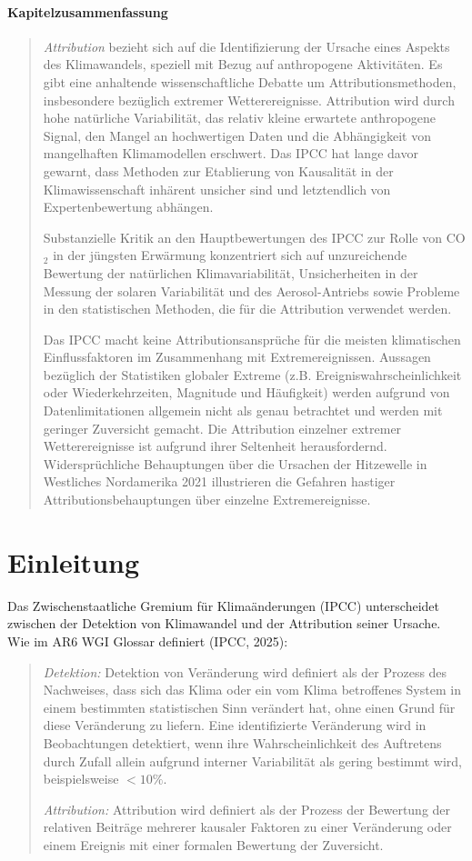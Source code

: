 \documentclass[12pt,paper=a4,DIV=12,parskip=never,chapterprefix=false,headings=standardclasses]{scrreprt}
\begin{document}
\paragraph{Kapitelzusammenfassung}
\begin{quote}
\emph{Attribution} bezieht sich auf die Identifizierung der Ursache eines Aspekts des Klimawandels, speziell mit Bezug auf anthropogene Aktivitäten. Es gibt eine anhaltende wissenschaftliche Debatte um Attributionsmethoden, insbesondere bezüglich extremer Wetterereignisse. Attribution wird durch hohe natürliche Variabilität, das relativ kleine erwartete anthropogene Signal, den Mangel an hochwertigen Daten und die Abhängigkeit von mangelhaften Klimamodellen erschwert. Das IPCC hat lange davor gewarnt, dass Methoden zur Etablierung von Kausalität in der Klimawissenschaft inhärent unsicher sind und letztendlich von Expertenbewertung abhängen.

Substanzielle Kritik an den Hauptbewertungen des IPCC zur Rolle von CO$_2$ in der jüngsten Erwärmung konzentriert sich auf unzureichende Bewertung der natürlichen Klimavariabilität, Unsicherheiten in der Messung der solaren Variabilität und des Aerosol-Antriebs sowie Probleme in den statistischen Methoden, die für die Attribution verwendet werden.

Das IPCC macht keine Attributionsansprüche für die meisten klimatischen Einflussfaktoren im Zusammenhang mit Extremereignissen. Aussagen bezüglich der Statistiken globaler Extreme (z.B. Ereigniswahrscheinlichkeit oder Wiederkehrzeiten, Magnitude und Häufigkeit) werden aufgrund von Datenlimitationen allgemein nicht als genau betrachtet und werden mit geringer Zuversicht gemacht. Die Attribution einzelner extremer Wetterereignisse ist aufgrund ihrer Seltenheit herausfordernd.
Widersprüchliche Behauptungen über die Ursachen der Hitzewelle in Westliches Nordamerika 2021 illustrieren die Gefahren hastiger Attributionsbehauptungen über einzelne Extremereignisse.
\end{quote}

\section{Einleitung}
Das Zwischenstaatliche Gremium für Klimaänderungen (IPCC) unterscheidet zwischen der Detektion von Klimawandel und der Attribution seiner Ursache. Wie im AR6 WGI Glossar definiert (IPCC, 2025):

\begin{quote}
\emph{Detektion:} Detektion von Veränderung wird definiert als der Prozess des Nachweises, dass sich das Klima oder ein vom Klima betroffenes System in einem bestimmten statistischen Sinn verändert hat, ohne einen Grund für diese Veränderung zu liefern. Eine identifizierte Veränderung wird in Beobachtungen detektiert, wenn ihre Wahrscheinlichkeit des Auftretens durch Zufall allein aufgrund interner Variabilität als gering bestimmt wird, beispielsweise $<10\%$.

\emph{Attribution:} Attribution wird definiert als der Prozess der Bewertung der relativen Beiträge mehrerer kausaler Faktoren zu einer Veränderung oder einem Ereignis mit einer formalen Bewertung der Zuversicht.
\end{quote}
\end{document}
